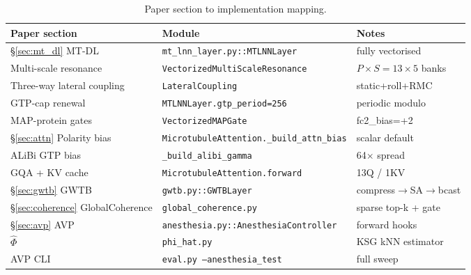 \documentclass[11pt]{article}
\theoremstyle{definition}
\newcommand{\phihat}{\hat{\Phi}}
\begin{document}
\begin{table}[h]
\centering
\caption{Paper section to implementation mapping.}
\begin{tabular}{lll}
\toprule
Paper section & Module & Notes \\
\midrule
\S\ref{sec:mt_dl} MT-DL & \texttt{mt\_lnn\_layer.py::MTLNNLayer} & fully vectorised \\
Multi-scale resonance & \texttt{VectorizedMultiScaleResonance} & $P\times S=13\times 5$ banks \\
Three-way lateral coupling & \texttt{LateralCoupling} & static+roll+RMC \\
GTP-cap renewal & \texttt{MTLNNLayer.gtp\_period=256} & periodic modulo \\
MAP-protein gates & \texttt{VectorizedMAPGate} & fc2\_bias=+2 \\
\S\ref{sec:attn} Polarity bias & \texttt{MicrotubuleAttention.\_build\_attn\_bias} & scalar default \\
ALiBi GTP bias & \texttt{\_build\_alibi\_gamma} & 64$\times$ spread \\
GQA + KV cache & \texttt{MicrotubuleAttention.forward} & 13Q / 1KV \\
\S\ref{sec:gwtb} GWTB & \texttt{gwtb.py::GWTBLayer} & compress$\to$SA$\to$bcast \\
\S\ref{sec:coherence} GlobalCoherence & \texttt{global\_coherence.py} & sparse top-k + gate \\
\S\ref{sec:avp} AVP & \texttt{anesthesia.py::AnesthesiaController} & forward hooks \\
$\phihat$ & \texttt{phi\_hat.py} & KSG kNN estimator \\
AVP CLI & \texttt{eval.py --anesthesia\_test} & full sweep \\
\bottomrule
\end{tabular}
\end{table}
\end{document}
